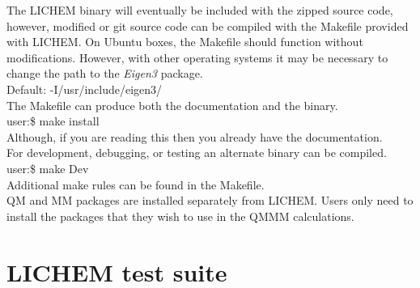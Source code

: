 \documentclass[12pt]{report}
\begin{document}
The LICHEM binary will eventually be included with the zipped source code,
however, modified or git source code can be compiled with the Makefile
provided with LICHEM.
On Ubuntu boxes, the Makefile should function without modifications.
However, with other operating systems it may be necessary to change the path
to the \textit{Eigen3} package. \\

Default: -I/usr/include/eigen3/ \\

The Makefile can produce both the documentation and the binary. \\

user:\$ make install \\

Although, if you are reading this then you already have the documentation. \\

For development, debugging, or testing an alternate binary can be compiled. \\

user:\$ make Dev \\

Additional make rules can be found in the Makefile. \\

QM and MM packages are installed separately from LICHEM.
Users only need to install the packages that they wish to use in the
QMMM calculations.

\section{LICHEM test suite}
\end{document}
